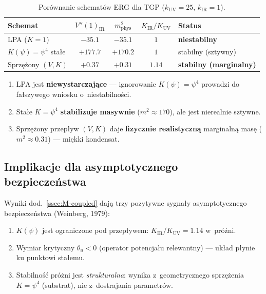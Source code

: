 \begin{table}[h]
\centering
\caption{Por\'ownanie schemat\'ow ERG dla TGP
  ($k_{\mathrm{UV}} = 25$, $k_{\mathrm{IR}} = 1$).}
\label{tab:M-comparison}
\begin{tabular}{@{}lcccl@{}}
\toprule
Schemat & $V''(1)_{\mathrm{IR}}$ & $m^2_{\mathrm{phys}}$
        & $K_{\mathrm{IR}}/K_{\mathrm{UV}}$ & Status \\
\midrule
LPA ($K=1$)
  & $-35.1$ & $-35.1$ & $1$ & \textbf{niestabilny} \\
$K(\psi)=\psi^4$ sta\l{}e
  & $+177.7$ & $+170.2$ & $1$ & stabilny (sztywny) \\
Sprz\k{e}\.zony $(V,K)$
  & $+0.37$ & $+0.31$ & $1.14$ & \textbf{stabilny (marginalny)} \\
\bottomrule
\end{tabular}
\end{table}

\begin{result}%
\label{res:M-hierarchy}
\begin{enumerate}[(1)]
\item LPA jest \textbf{niewystarczaj\k{a}ce} ---
      ignorowanie $K(\psi)=\psi^4$ prowadzi
      do fa\l{}szywego wniosku o~niestabilno\'sci.
\item Sta\l{}e $K = \psi^4$ \textbf{stabilizuje masywnie}
      ($m^2 \approx 170$), ale jest nierealnie sztywne.
\item Sprz\k{e}\.zony przep\l{}yw $(V,K)$ daje
      \textbf{fizycznie realistyczn\k{a}} marginaln\k{a} mas\k{e}
      ($m^2 \approx 0.31$) --- mi\k{e}kki kondensat.
\end{enumerate}
\end{result}

\subsection{Implikacje dla asymptotycznego bezpiecze\'nstwa}
\label{ssec:M-asymptotic-safety}

Wyniki dod.~\ref{ssec:M-coupled} daj\k{a} trzy pozytywne
sygna\l{}y asymptotycznego bezpiecze\'nstwa (Weinberg, 1979):

\begin{enumerate}[(S1)]
\item $K(\psi)$ jest ograniczone pod przep\l{}ywem:
      $K_{\mathrm{IR}}/K_{\mathrm{UV}} = 1.14$ w~pr\'o\.zni.
\item Wymiar krytyczny $\theta_u < 0$ (operator potencja\l{}u
      relewantny) --- uk\l{}ad p\l{}ynie ku punktowi sta\l{}emu.
\item Stabilno\'s\'c pr\'o\.zni jest \emph{strukturalna}:
      wynika z~geometrycznego sprz\k{e}\.zenia
      $K = \psi^4$ (substrat), nie z~dostrajania parametr\'ow.
\end{enumerate}

